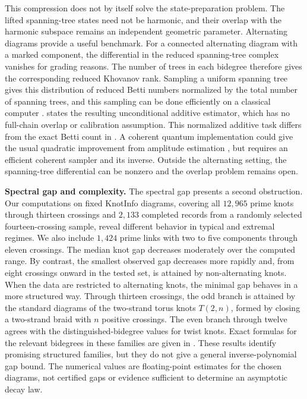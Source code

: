 \documentclass[a4paper,onecolumn,unpublished]{quantumarticle}
\theoremstyle{plain}
\theoremstyle{definition}
\theoremstyle{definition}
\numberwithin{equation}{section}
\begin{document}
This compression does not by itself solve the state-preparation problem.  The lifted spanning-tree states need not be harmonic, and their overlap with the harmonic subspace remains an independent geometric parameter.  Alternating diagrams provide a useful benchmark.  For a connected alternating diagram with a marked component, the differential in the reduced spanning-tree complex vanishes for grading reasons.  The number of trees in each bidegree therefore gives the corresponding reduced Khovanov rank.  Sampling a uniform spanning tree gives this distribution of reduced Betti numbers normalized by the total number of spanning trees, and this sampling can be done efficiently on a classical computer \cite{Wilson96}.   states the resulting unconditional additive estimator, which has no full-chain overlap or calibration assumption. This normalized additive task differs from the exact Betti count in . A coherent quantum implementation could give the usual quadratic improvement from amplitude estimation \cite{Montanaro2015}, but requires an efficient coherent sampler and its inverse.  Outside the alternating setting, the spanning-tree differential can be nonzero and the overlap problem remains open.
\smallskip 

\noindent \textbf{Spectral gap and complexity.} The spectral gap presents a second obstruction. Our computations on fixed KnotInfo diagrams, covering all $12{,}965$ prime knots through thirteen crossings and $2{,}133$ completed records from a randomly selected fourteen-crossing sample, reveal different behavior in typical and extremal regimes. We also include $1{,}424$ prime links with two to five components through eleven crossings.
The median knot gap decreases moderately over the computed range. By contrast, the smallest observed gap decreases more rapidly and, from eight crossings onward in the tested set, is attained by non-alternating knots. When the data are restricted to alternating knots, the minimal gap behaves in a more structured way. Through thirteen crossings, the odd branch is attained by the standard diagrams of the two-strand torus knots $T(2,n)$, formed by closing a two-strand braid with $n$ positive crossings. The even branch through twelve agrees with the distinguished-bidegree values for twist knots. Exact formulas for the relevant bidegrees in these families are given in \cite{GrljLaudaSpectralGeometry}. These results identify promising structured families, but they do not give a general inverse-polynomial gap bound. The numerical values are floating-point estimates for the chosen diagrams, not certified gaps or evidence sufficient to determine an asymptotic decay law.
\end{document}
